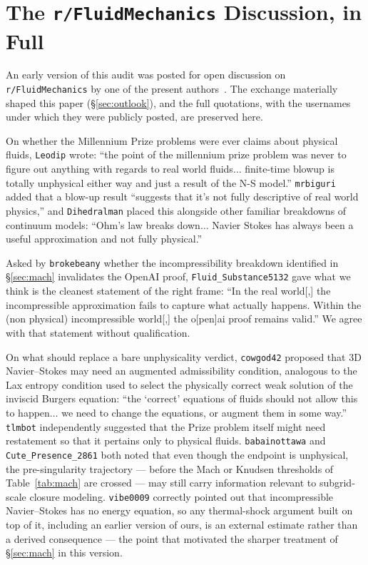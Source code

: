\documentclass[11pt,a4paper]{article}
\begin{document}
\section{The \texttt{r/FluidMechanics} Discussion, in Full}
\label{app:reddit}

An early version of this audit was posted for open discussion on \texttt{r/FluidMechanics} by one
of the present authors~\cite{RedditFluidMech2026}. The exchange materially shaped this paper
(\S\ref{sec:outlook}), and the full quotations, with the usernames under which they were publicly
posted, are preserved here.

On whether the Millennium Prize problems were ever claims about physical fluids, \texttt{Leodip}
wrote: ``the point of the millennium prize problem was never to figure out anything with regards to
real world fluids$\ldots$ finite-time blowup is totally unphysical either way and just a result of
the N-S model.'' \texttt{mrbiguri} added that a blow-up result ``suggests that it's not fully
descriptive of real world physics,'' and \texttt{Dihedralman} placed this alongside other familiar
breakdowns of continuum models: ``Ohm's law breaks down$\ldots$ Navier Stokes has always been a
useful approximation and not fully physical.''

Asked by \texttt{brokebeany} whether the incompressibility breakdown identified in
\S\ref{sec:mach} invalidates the OpenAI proof, \texttt{Fluid\_Substance5132} gave what we think is
the cleanest statement of the right frame: ``In the real world[,] the incompressible approximation
fails to capture what actually happens. Within the (non physical) incompressible world[,] the
o[pen]ai proof remains valid.'' We agree with that statement without qualification.

On what should replace a bare unphysicality verdict, \texttt{cowgod42} proposed that 3D
Navier--Stokes may need an augmented admissibility condition, analogous to the Lax entropy
condition used to select the physically correct weak solution of the inviscid Burgers equation:
``the `correct' equations of fluids should not allow this to happen$\ldots$ we need to change the
equations, or augment them in some way.'' \texttt{tlmbot} independently suggested that the Prize
problem itself might need restatement so that it pertains only to physical fluids.
\texttt{babainottawa} and \texttt{Cute\_Presence\_2861} both noted that even though the endpoint is
unphysical, the pre-singularity trajectory --- before the Mach or Knudsen thresholds of
Table~\ref{tab:mach} are crossed --- may still carry information relevant to subgrid-scale closure
modeling. \texttt{vibe0009} correctly pointed out that incompressible Navier--Stokes has no energy
equation, so any thermal-shock argument built on top of it, including an earlier version of ours, is
an external estimate rather than a derived consequence --- the point that motivated the sharper
treatment of \S\ref{sec:mach} in this version.
\end{document}

